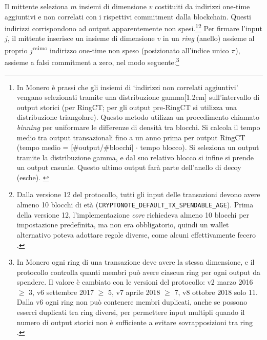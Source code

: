 Il mittente seleziona $m$ insiemi di dimensione $v$ costituiti da indirizzi one-time aggiuntivi e non correlati con i rispettivi commitment dalla blockchain. Questi indirizzi corrispondono ad output apparentemente non spesi.\footnote{\label{input-selection}In Monero è prassi che gli insiemi di `indirizzi non correlati aggiuntivi' vengano selezionati tramite una distribuzione gamma[1.2cm] sull’intervallo di output storici (per RingCT; per gli output pre-RingCT si utilizza una distribuzione triangolare). Questo metodo utilizza un procedimento chiamato \emph{binning} per uniformare le differenze di densità tra blocchi. Si calcola il tempo medio tra output transazionali fino a un anno prima per output RingCT (tempo medio = [\#output/\#blocchi] $\cdot$ tempo blocco). Si seleziona un output tramite la distribuzione gamma, e dal suo relativo blocco si infine si prende un output casuale. Questo ultimo output farà parte dell'anello di decoy (esche). \cite{AnalysisOfLinkability}}\footnote{Dalla versione 12 del protocollo, tutti gli input delle transazioni devono avere almeno 10 blocchi di età ({\tt CRYPTONOTE\_DEFAULT\_TX\_SPENDABLE\_AGE}). Prima della versione 12, l’implementazione \emph{core} richiedeva almeno 10 blocchi per impostazione predefinita, ma non era obbligatorio, quindi un wallet alternativo poteva adottare regole diverse, come alcuni effettivamente fecero \cite{visualizing-monero-vid}.} Per firmare l’input $j$, il mittente inserisce un insieme di dimensione $v$ in un {\em ring} (anello) assieme al proprio $j$\textsuperscript{esimo} indirizzo one-time non speso (posizionato all’indice unico $\pi$), assieme a falsi commitment a zero, nel modo seguente:\footnote{In Monero ogni ring di una transazione deve avere la stessa dimensione, e il protocollo controlla quanti membri può avere ciascun ring per ogni output da spendere. Il valore è cambiato con le versioni del protocollo: v2 marzo 2016 $\geq$ 3, v6 settembre 2017 $\geq$ 5, v7 aprile 2018 $\geq$ 7, v8 ottobre 2018 solo 11. Dalla v6 ogni ring non può contenere membri duplicati, anche se possono esserci duplicati tra ring diversi, per permettere input multipli quando il numero di output storici non è sufficiente a evitare sovrapposizioni tra ring \cite{duplicate-ring-members}.}

